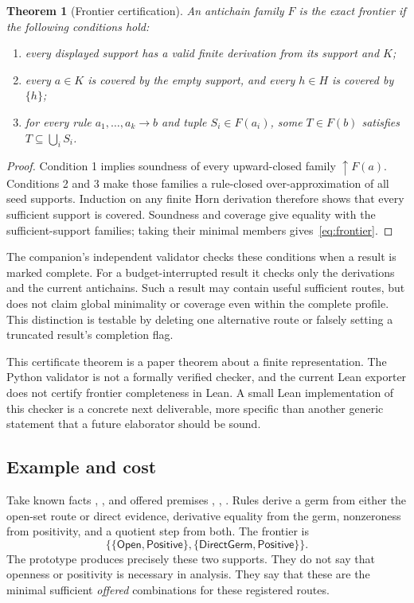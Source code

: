 \documentclass[11pt,a4paper]{article}
\newcommand{\code}[1]{\texttt{\small\detokenize{#1}}}
\newtheorem{theorem}{Theorem}[section]
\theoremstyle{definition}\newtheorem{definition}[theorem]{Definition}
\theoremstyle{remark}\newtheorem{remark}[theorem]{Remark}
\begin{document}
\begin{theorem}[Frontier certification]\label{thm:cert}
An antichain family $F$ is the exact frontier if the following conditions hold:
\begin{enumerate}
\item every displayed support has a valid finite derivation from its support and $K$;
\item every $a\in K$ is covered by the empty support, and every $h\in H$ is covered by $\{h\}$;
\item for every rule $a_1,\ldots,a_k\to b$ and tuple $S_i\in F(a_i)$, some $T\in F(b)$ satisfies $T\subseteq\bigcup_i S_i$.
\end{enumerate}
\end{theorem}
\begin{proof}
Condition 1 implies soundness of every upward-closed family $\uparrow F(a)$. Conditions 2 and 3 make those families a rule-closed over-approximation of all seed supports. Induction on any finite Horn derivation therefore shows that every sufficient support is covered. Soundness and coverage give equality with the sufficient-support families; taking their minimal members gives~\eqref{eq:frontier}.
\end{proof}

The companion's independent validator checks these conditions when a result is marked complete. For a budget-interrupted result it checks only the derivations and the current antichains. Such a result may contain useful sufficient routes, but does not claim global minimality or coverage even within the complete profile. This distinction is testable by deleting one alternative route or falsely setting a truncated result's completion flag.

This certificate theorem is a paper theorem about a finite representation. The Python validator is not a formally verified checker, and the current Lean exporter does not certify frontier completeness in Lean. A small Lean implementation of this checker is a concrete next deliverable, more specific than another generic statement that a future elaborator should be sound.

\subsection{Example and cost}
Take known facts \code{OnSet}, \code{Member}, and offered premises \code{Open}, \code{DirectGerm}, \code{Positive}. Rules derive a germ from either the open-set route or direct evidence, derivative equality from the germ, nonzeroness from positivity, and a quotient step from both. The frontier is
\[
 \{\{\mathsf{Open},\mathsf{Positive}\},
    \{\mathsf{DirectGerm},\mathsf{Positive}\}\}.
\]
The prototype produces precisely these two supports. They do not say that openness or positivity is necessary in analysis. They say that these are the minimal sufficient \emph{offered} combinations for these registered routes.
\end{document}
